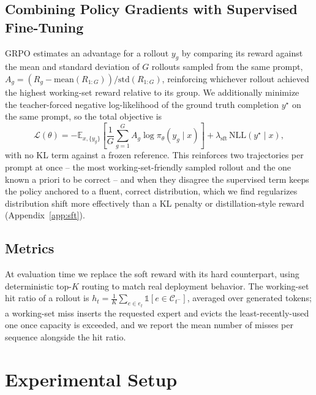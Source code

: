 \documentclass{article}
\begin{document}
\subsection{Combining Policy Gradients with Supervised Fine-Tuning}
\label{sec:sft}

GRPO estimates an advantage for a rollout $y_g$ by comparing its reward against the
mean and standard deviation of $G$ rollouts sampled from the same prompt,
$A_g = (R_g - \mathrm{mean}(R_{1:G})) / \mathrm{std}(R_{1:G})$, reinforcing whichever
rollout achieved the highest working-set reward relative to its group. We additionally
minimize the teacher-forced negative log-likelihood of the ground truth completion
$y^\star$ on the same prompt, so the total objective is
\begin{equation}
  \mathcal{L}(\theta) = -\mathbb{E}_{x, \{y_g\}} \left[ \frac{1}{G} \sum_{g=1}^{G}
    A_g \log \pi_\theta(y_g \mid x) \right] + \lambda_{\mathrm{sft}}\, \mathrm{NLL}(y^\star \mid x),
  \label{eq:combinedloss}
\end{equation}
with no KL term against a frozen reference. This reinforces two trajectories per prompt
at once -- the most working-set-friendly sampled rollout and the one known a priori to be
correct -- and when they disagree the supervised term keeps the policy anchored to a
fluent, correct distribution, which we find regularizes distribution shift more
effectively than a KL penalty or distillation-style reward (Appendix~\ref{app:sft}).

\subsection{Metrics}
\label{sec:metrics}

At evaluation time we replace the soft reward with its hard counterpart, using
deterministic top-$K$ routing to match real deployment behavior. The working-set hit
ratio of a rollout is
$h_t = \frac{1}{K} \sum_{e \in e_t} \mathbb{1}[e \in \mathcal{C}_{t^-}]$, averaged over
generated tokens; a working-set miss inserts the requested expert and evicts the
least-recently-used one once capacity is exceeded, and we report the mean number of
misses per sequence alongside the hit ratio.

\section{Experimental Setup}
\label{sec:setup}
\end{document}
